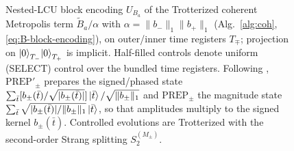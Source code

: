 \documentclass{article}
\begin{document}
\begin{figure}[ht]
{%
  }
  \caption{Nested-LCU block encoding $U_{B_a}$ of the Trotterized coherent
  Metropolis term $\tilde{B}_a/\alpha$ with $\alpha=\lVert b_-\rVert_1\lVert b_+\rVert_1$
  (Alg.~\ref*{alg:coh}, \eqref{eq:B-block-encoding}), on outer/inner time
  registers $T_\mp$; projection on $\ket{0}_{T_-}\!\ket{0}_{T_+}$ is implicit.
  Half-filled controls denote uniform (SELECT) control over the bundled time
  registers. Following \cite[Fig.~4]{chen2023efficient},
  $\text{PREP}'_\pm$ prepares the signed/phased state
  $\sum_{\bar t}[b_\pm(\bar t)/\sqrt{|b_\pm(\bar t)|}]\ket{\bar t}/\sqrt{\lVert b_\pm\rVert_1}$
  and $\text{PREP}_\pm$ the magnitude state
  $\sum_{\bar t}\sqrt{|b_\pm(\bar t)|/\lVert b_\pm\rVert_1}\ket{\bar t}$,
  so that amplitudes multiply to the signed kernel $b_\pm(\bar t)$. Controlled
  evolutions are Trotterized with the second-order Strang splitting $S_2^{(M_\pm)}$.}
  \label{fig:block-encoding-ba-halfctrl}
\end{figure}
\end{document}
